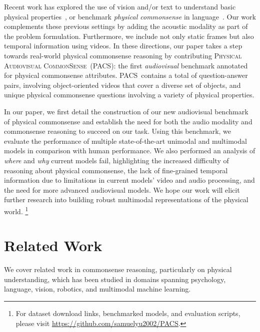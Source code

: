 \documentclass[runningheads]{llncs}
\newcommand{\namel}{\textsc{Physical Audiovisual CommonSense}}
\newcommand{\names}{\textsc{PACS}}
\begin{document}
Recent work has explored the use of vision and/or text to understand basic physical properties~\cite{hessel2018quantifying,jimenez2020learning,krishna2017visual,Storks2021TieredRF,yatskar2017commonly,zhao-etal-2020-learning}, or benchmark \textit{physical commonsense} in language~\cite{bisk2020piqa,Forbes2019DoNL}. Our work complements these previous settings by adding the acoustic modality as part of the problem formulation. Furthermore, we include not only static frames but also temporal information using videos. In these directions, our paper takes a step towards real-world physical commonsense reasoning by contributing \namel\ (\names): the first \textit{audiovisual} benchmark annotated for physical commonsense attributes. \names\ contains a total of  question-answer pairs, involving  object-oriented videos that cover a diverse set of objects, and  unique physical commonsense questions involving a variety of physical properties. 

In our paper, we first detail the construction of our new audiovisual benchmark of physical commonsense and establish the need for both the audio modality and commonsense reasoning to succeed on our task. Using this benchmark, we evaluate the performance of multiple state-of-the-art unimodal and multimodal models in comparison with human performance. We also performed an analysis of \textit{where} and \textit{why} current models fail, highlighting the increased difficulty of reasoning about physical commonsense, the lack of fine-grained temporal information due to limitations in current models' video and audio processing, and the need for more advanced audiovisual models. We hope our work will elicit further research into building robust multimodal representations of the physical world. \footnote{For dataset download links, benchmarked models, and evaluation scripts, please visit \href{https://github.com/samuelyu2002/PACS}{\color{red}\underline{https://github.com/samuelyu2002/PACS}}.}



\section{Related Work}
\label{sec:related_work}


We cover related work in commonsense reasoning, particularly on physical understanding, which has been studied in domains spanning psychology, language, vision, robotics, and multimodal machine learning.
\end{document}
